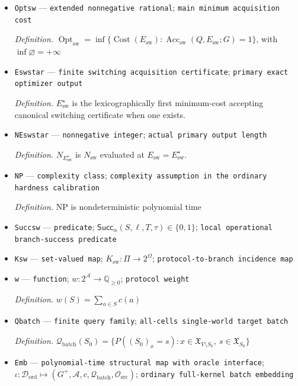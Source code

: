 \documentclass{article}
\begin{document}
\begin{itemize}
  \item \texttt{Optsw} --- \texttt{extended nonnegative rational}; \texttt{main minimum acquisition cost}
  \par\smallskip\noindent\emph{Definition.} \(\operatorname{Opt}_{\mathrm{sw}}=\inf\{\operatorname{Cost}(E_{\mathrm{sw}}):\operatorname{Acc}_{\mathrm{sw}}(Q,E_{\mathrm{sw}};G)=1\}\), with \(\inf\varnothing=+\infty\)
  \item \texttt{Eswstar} --- \texttt{finite switching acquisition certificate}; \texttt{primary exact optimizer output}
  \par\smallskip\noindent\emph{Definition.} \(E_{\mathrm{sw}}^{\star}\) is the lexicographically first minimum-cost accepting canonical switching certificate when one exists.
  \item \texttt{NEswstar} --- \texttt{nonnegative integer}; \texttt{actual primary output length}
  \par\smallskip\noindent\emph{Definition.} \(N_{E_{\mathrm{sw}}^{\star}}\) is \(N_{\mathrm{sw}}\) evaluated at \(E_{\mathrm{sw}}=E_{\mathrm{sw}}^{\star}\).
  \item \texttt{NP} --- \texttt{complexity class}; \texttt{complexity assumption in the ordinary hardness calibration}
  \par\smallskip\noindent\emph{Definition.} \(\mathrm{NP}\) is nondeterministic polynomial time
  \item \texttt{Succsw} --- \texttt{predicate}; \(\mathsf{Succ}_{\alpha}(S,\ell,T,\tau)\in\{0,1\}\); \texttt{local operational branch-\allowbreak{}success predicate}
  \item \texttt{Ksw} --- \texttt{set-\allowbreak{}valued map}; \(K_{\mathrm{sw}}:\Pi\to 2^{\Omega}\); \texttt{protocol-\allowbreak{}to-\allowbreak{}branch incidence map}
  \item \texttt{w} --- \texttt{function}; \(w:2^{\mathcal A}\to\mathbb Q_{\ge0}\); \texttt{protocol weight}
  \par\smallskip\noindent\emph{Definition.} \(w(S)=\sum_{a\in S}c(a)\)
  \item \texttt{Qbatch} --- \texttt{finite query family}; \texttt{all-\allowbreak{}cells single-\allowbreak{}world target batch}
  \par\smallskip\noindent\emph{Definition.} \(\mathcal Q_{\mathrm{batch}}(S_0)=\{P((S_0)_x=s):x\in\mathfrak X_{V\setminus S_0},\ s\in\mathfrak X_{S_0}\}\)
  \item \texttt{Emb} --- \texttt{polynomial-\allowbreak{}time structural map with oracle interface}; \(\iota:\mathcal D_{\mathrm{ord}}\mapsto(G^{+},\mathcal A,c,\mathcal Q_{\mathrm{batch}},\mathcal O_{\mathrm{src}})\); \texttt{ordinary full-\allowbreak{}kernel batch embedding}

\end{itemize}
\end{document}
